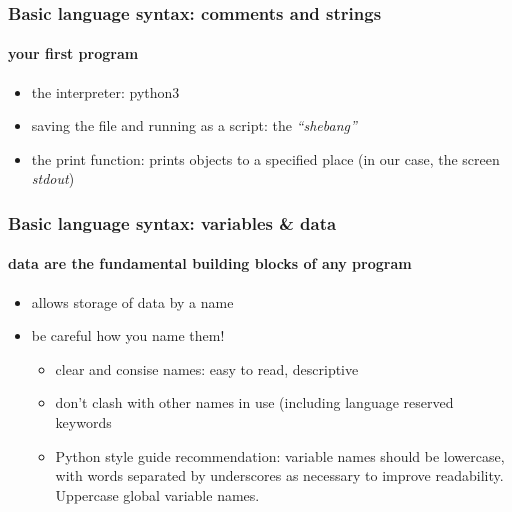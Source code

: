 \documentclass{beamer}
\begin{document}

    \begin{frame}
	    \frametitle{Basic language syntax: comments and strings}
	    \framesubtitle{your first program}
	    \begin{itemize}
		    \item the interpreter: python3
		    \item saving the file and running as a script: the \textit{``shebang''}
		    \item the print function: prints objects to a specified place (in our case, the screen \textit{stdout})
	    \end{itemize}
	    \lstB
    \end{frame}








    \begin{frame}
	    \frametitle{Basic language syntax: variables \& data}
	    \framesubtitle{data are the fundamental building blocks of any program}
	    \begin{itemize}
		    \item allows storage of data by a name
		    \item be careful how you name them!
			    \begin{itemize}
				    \item clear and consise names: easy to read, descriptive
				    \item don't clash with other names in use (including language reserved keywords
				    \item Python style guide recommendation: variable names should be lowercase, with words separated by underscores as necessary to improve readability.
					    Uppercase global variable names.
			    \end{itemize}
	    \end{itemize}
	    \lstC
    \end{frame}
\end{document}
